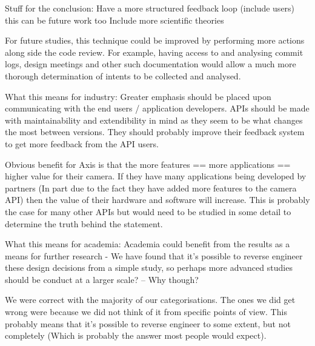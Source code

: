 \documentclass{sig-alternate}
\begin{document}
Stuff for the conclusion:
Have a more structured feedback loop (include users) this can be future work too
Include more scientific theories



For future studies, this technique could be improved by performing more actions along side the code review. For example, having access to and analysing commit logs, design meetings and other such documentation would allow a much more thorough determination of intents to be collected and analysed. %


       What this means for industry:
              Greater emphasis should be placed upon communicating with the end users / application developers. APIs should be made with maintainability and extendibility in mind as they seem to be what changes the most between versions. They should probably improve their feedback system to get more feedback from the API users.

              Obvious benefit for Axis is that the more features == more applications == higher value for their camera. If they have many applications being developed by partners (In part due to the fact they have added more features to the camera API) then the value of their hardware and software will increase. This is probably the case for many other APIs but would need to be studied in some detail to determine the truth behind the statement.

       What this means for academia:
              Academia could benefit from the results as a means for further research - We have found that it's possible to reverse engineer these design decisions from a simple study, so perhaps more advanced studies should be conduct at a larger scale? -- Why though?


We were correct with the majority of our categorisations. The ones we did get wrong were because we did not think of it from specific points of view. This probably means that it's possible to reverse engineer to some extent, but not completely (Which is probably the answer most people would expect).
\end{document}
